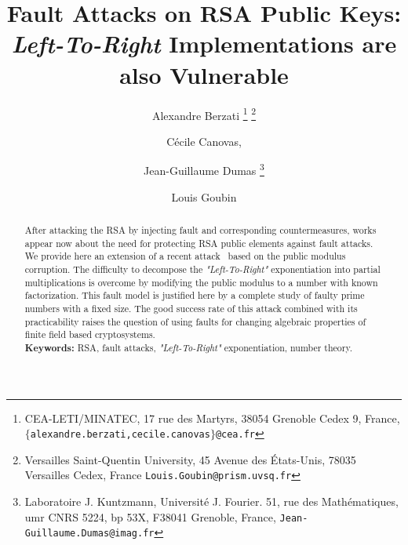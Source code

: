 \documentclass{article}
\title{\textbf{Fault Attacks on RSA Public Keys: \textit{Left-To-Right} Implementations are also Vulnerable}}
\author{
Alexandre Berzati
\thanks{CEA-LETI/MINATEC, 17 rue des
Martyrs, 38054 Grenoble Cedex 9, France,
\texttt{$\lbrace$alexandre.berzati,cecile.canovas$\rbrace$@cea.fr}}
\thanks{Versailles Saint-Quentin University, 45 Avenue des
  \'Etats-Unis, 78035 Versailles Cedex, France
\texttt{Louis.Goubin@prism.uvsq.fr}}
\and C\'ecile Canovas\footnotemark[1], 
\and Jean-Guillaume Dumas 
\thanks{Laboratoire J. Kuntzmann,
Universit\'e J. Fourier.
51, rue des Math\'ematiques,
umr CNRS 5224, bp 53X,
F38041 Grenoble, France,
\texttt{Jean-Guillaume.Dumas@imag.fr}
}
\and 
Louis Goubin
\footnotemark[2]
}
\begin{document}
\maketitle

\begin{abstract}
After attacking the RSA by injecting fault and corresponding
countermeasures, works appear now about the need for protecting RSA
public elements against fault attacks. We provide here an extension of
a recent attack~\cite{77} based on the public modulus corruption. The
difficulty to decompose the \textit{"Left-To-Right"} exponentiation
into partial multiplications is overcome by modifying the public
modulus to a number with known factorization. This fault model is
justified here by a complete study of faulty prime numbers with a
fixed size. The good success rate of this attack combined with its
practicability raises the question of using faults for changing
algebraic properties of finite field based cryptosystems.
 \vspace{10pt}\\
 \textbf{Keywords:} RSA, fault attacks, \textit{"Left-To-Right"} exponentiation, number theory.

\end{abstract}
\end{document}
